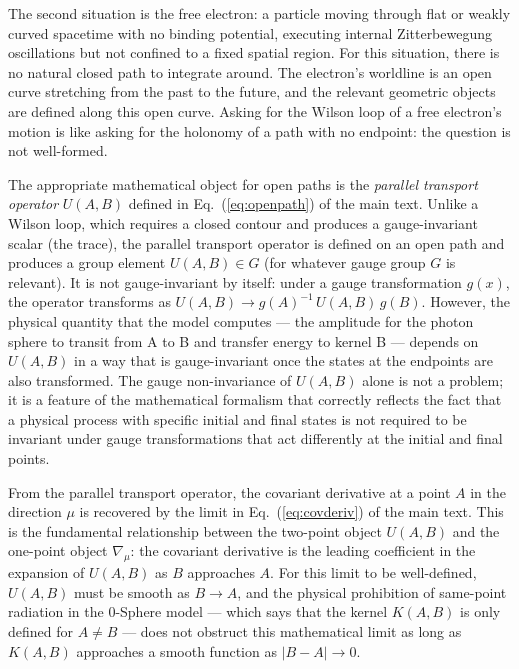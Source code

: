 \documentclass[%
 reprint,
 amsmath,amssymb,
 aps,
 prb,
]{revtex4-2}
\numberwithin{equation}{section}
\begin{document}
The second situation is the free electron: a particle moving through flat or weakly curved spacetime with no binding potential, executing internal Zitterbewegung oscillations but not confined to a fixed spatial region. For this situation, there is no natural closed path to integrate around. The electron's worldline is an open curve stretching from the past to the future, and the relevant geometric objects are defined along this open curve. Asking for the Wilson loop of a free electron's motion is like asking for the holonomy of a path with no endpoint: the question is not well-formed.

The appropriate mathematical object for open paths is the \emph{parallel transport operator} $U(A,B)$ defined in Eq.~(\ref{eq:openpath}) of the main text. Unlike a Wilson loop, which requires a closed contour and produces a gauge-invariant scalar (the trace), the parallel transport operator is defined on an open path and produces a group element $U(A,B) \in G$ (for whatever gauge group $G$ is relevant). It is not gauge-invariant by itself: under a gauge transformation $g(x)$, the operator transforms as $U(A,B) \to g(A)^{-1}\,U(A,B)\,g(B)$. However, the physical quantity that the model computes --- the amplitude for the photon sphere to transit from A to B and transfer energy to kernel B --- depends on $U(A,B)$ in a way that is gauge-invariant once the states at the endpoints are also transformed. The gauge non-invariance of $U(A,B)$ alone is not a problem; it is a feature of the mathematical formalism that correctly reflects the fact that a physical process with specific initial and final states is not required to be invariant under gauge transformations that act differently at the initial and final points.

From the parallel transport operator, the covariant derivative at a point $A$ in the direction $\mu$ is recovered by the limit in Eq.~(\ref{eq:covderiv}) of the main text. This is the fundamental relationship between the two-point object $U(A,B)$ and the one-point object $\nabla_\mu$: the covariant derivative is the leading coefficient in the expansion of $U(A,B)$ as $B$ approaches $A$. For this limit to be well-defined, $U(A,B)$ must be smooth as $B\to A$, and the physical prohibition of same-point radiation in the 0-Sphere model --- which says that the kernel $K(A,B)$ is only defined for $A\neq B$ --- does not obstruct this mathematical limit as long as $K(A,B)$ approaches a smooth function as $|B-A|\to 0$.
\end{document}
